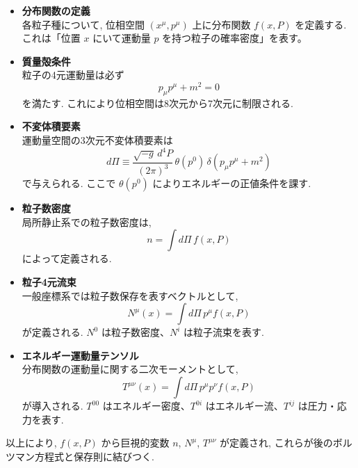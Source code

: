 \documentclass[a4paper,12pt]{article}
\begin{document}
\begin{itemize}
  \item \textbf{分布関数の定義}\\
  各粒子種について, 位相空間 $(x^\mu, p^\mu)$ 上に分布関数 $f(x,P)$ を定義する.  
  これは「位置 $x$ にいて運動量 $p$ を持つ粒子の確率密度」を表す。

  \item \textbf{質量殻条件}\\ 
  粒子の4元運動量は必ず
  \begin{equation}
    p_\mu p^\mu + m^2 = 0
    \tag{6.1}
  \end{equation}
  を満たす. これにより位相空間は8次元から7次元に制限される.

  \item \textbf{不変体積要素}\\  
  運動量空間の3次元不変体積要素は
  \begin{equation}
    d\Pi \equiv \frac{\sqrt{-g}\, d^4P}{(2\pi)^3}\,\theta(p^0)\,\delta(p_\mu p^\mu + m^2)
    \tag{6.2}
  \end{equation}
  で与えられる. ここで $\theta(p^0)$ によりエネルギーの正値条件を課す.

  \item \textbf{粒子数密度}\\  
  局所静止系での粒子数密度は,
  \begin{equation}
    n = \int d\Pi \, f(x,P)
    \tag{6.6}
  \end{equation}
  によって定義される.

  \item \textbf{粒子4元流束}\\  
  一般座標系では粒子数保存を表すベクトルとして,
  \begin{equation}
    N^\mu(x) = \int d\Pi \, p^\mu f(x,P)
    \tag{6.10}
  \end{equation}
  が定義される. $N^0$ は粒子数密度、$N^i$ は粒子流束を表す.

  \item \textbf{エネルギー運動量テンソル}\\  
  分布関数の運動量に関する二次モーメントとして,
  \begin{equation}
    T^{\mu\nu}(x) = \int d\Pi \, p^\mu p^\nu f(x,P)
    \tag{6.17}
  \end{equation}
  が導入される. $T^{00}$ はエネルギー密度、$T^{0i}$ はエネルギー流、$T^{ij}$ は圧力・応力を表す.
\end{itemize}

\noindent
以上により, $f(x,P)$ から巨視的変数 $n$, $N^\mu$, $T^{\mu\nu}$ が定義され, これらが後のボルツマン方程式と保存則に結びつく.
\end{document}
